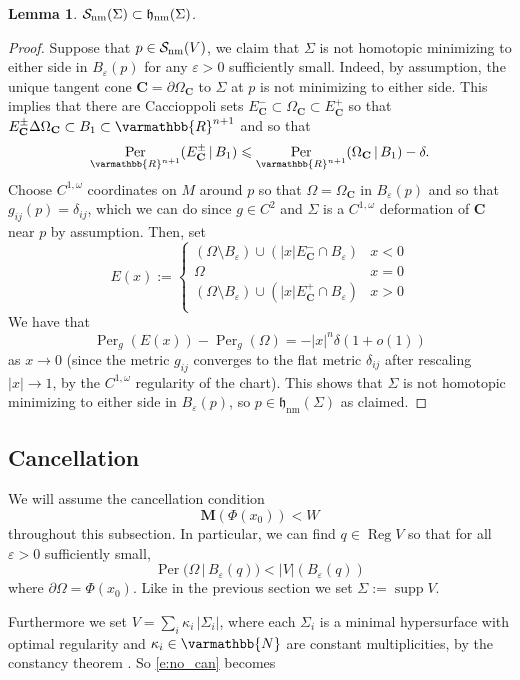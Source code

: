 \documentclass[12pt,twoside]{amsart}
\numberwithin{equation}{section}
\renewcommand{\leq}{\leqslant}
\renewcommand{\mathbb}{\varmathbb}
\newtheorem{lemma}[theorem]{Lemma}
\newcommand{\NN}{\mathbb{N}}
\newcommand{\RR}{\mathbb{R}}
\newcommand{\Snm}{\mathcal{S}_{\textnormal{nm}}}
\newcommand{\bC}{\mathbf{C}}
\newcommand{\bM}{\mathbf{M}}
\DeclareMathOperator{\Per}{Per}
\DeclareMathOperator{\supp}{supp}
\newcommand{\eps}{\varepsilon}
\DeclareMathOperator{\reg}{Reg}
\begin{document}
\begin{lemma}\label{lem:snm-hnm}
$\Snm(\Sigma)\subset \mathfrak{h}_\textrm{nm}(\Sigma)$.
\end{lemma}
\begin{proof}
Suppose that $p \in \Snm(V)$, we claim that $\Sigma$ is not homotopic minimizing to either side in $B_\eps(p)$ for any $\eps>0$ sufficiently small. Indeed, by assumption, the unique tangent cone $\bC = \partial\Omega_\bC$ to $\Sigma$ at $p$ is not minimizing to either side. This implies that there are Caccioppoli sets $E_\bC^- \subset \Omega_\bC \subset E_\bC^+$ so that $E_\bC^\pm \Delta\Omega_\bC \subset B_1 \subset \RR^{n+1}$ and so that
\[
\Per_{\RR^{n+1}}(E_\bC^\pm\,|\,B_1) \leq \Per_{\RR^{n+1}}(\Omega_\bC\,|\,B_1) - \delta.
\]
Choose $C^{1,\omega}$ coordinates on $M$ around $p$ so that $\Omega = \Omega_\bC$ in $B_\eps(p)$ and so that $g_{ij}(p) = \delta_{ij}$, which we can do since $g\in C^2$ and $\Sigma$ is a $C^{1,\omega}$ deformation of $\bC$ near $p$ by assumption. Then, set 
\[
E(x) := \begin{cases}
 (\Omega\setminus B_\eps) \cup (|x| E_\bC^- \cap B_\eps) & x < 0\\
 \Omega & x = 0\\
 (\Omega\setminus B_\eps) \cup (|x| E_\bC^+ \cap B_\eps) & x > 0\\
 \end{cases}
\]
We have that 
\[
\Per_g(E(x)) - \Per_g(\Omega) = - |x|^n \delta (1+o(1))
\]
as $x\to 0$ (since the metric $g_{ij}$ converges to the flat metric $\delta_{ij}$ after rescaling $|x| \to 1$, by the $C^{1,\omega}$ regularity of the chart). This shows that $\Sigma$ is not homotopic minimizing to either side in $B_\eps(p)$, so $p\in\mathfrak{h}_\textrm{nm}(\Sigma)$ as claimed. 
\end{proof}

\subsection{Cancellation} We will assume the cancellation condition
\[
\bM(\Phi(x_0)) < W
\]
throughout this subsection. In particular, we can find $q \in \reg V$ so that for all $\eps>0$ sufficiently small,
\[
\Per(\Omega\,|\,B_\eps(q)) < | V |(B_\eps(q)) 
\]
where $\partial \Omega = \Phi(x_0)$. Like in the previous section we set $\Sigma := \supp V$. 

Furthermore we set $V=\sum_{i}\kappa_i\,|\Sigma_i|$, where each $\Sigma_i$ is a minimal hypersurface with optimal regularity and $\kappa_i\in \NN$ are constant multiplicities, by the constancy theorem \cite[Theorem 41.1]{Sim}. So \eqref{e:no_can} becomes
\end{document}
